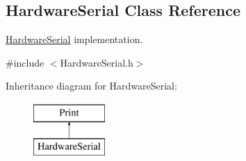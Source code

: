 \hypertarget{class_hardware_serial}{
\subsection{HardwareSerial Class Reference}
\label{class_hardware_serial}
}


\hyperlink{class_hardware_serial}{HardwareSerial} implementation.  




{\ttfamily \#include $<$HardwareSerial.h$>$}

Inheritance diagram for HardwareSerial:\begin{figure}[H]
\begin{center}
\leavevmode
\includegraphics[height=2.000000cm]{class_hardware_serial}
\end{center}
\end{figure}
